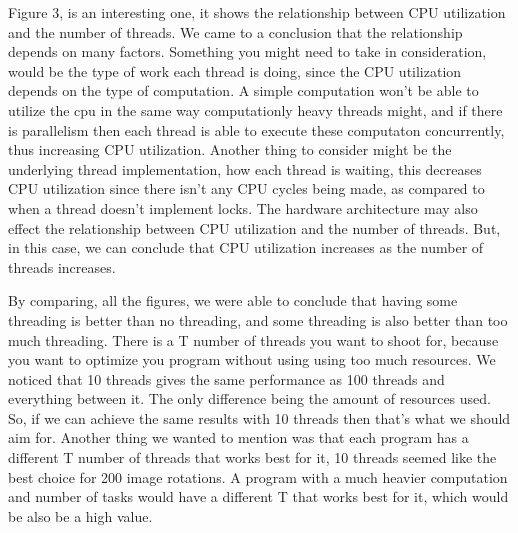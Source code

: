 \documentclass[11pt, titlepage]{article}
\begin{document}
  Figure 3, is an interesting one, it shows the relationship between CPU utilization and the number of threads. We came to a conclusion that the
  relationship depends on many factors. Something you might need to take in consideration, would be the type of work each thread is doing, since
  the CPU utilization depends on the type of computation. A simple computation won't be able to utilize the cpu in the same way computationly heavy
  threads might, and if there is parallelism then each thread is able to execute these computaton concurrently, thus increasing CPU utilization.
  Another thing to consider might be the underlying thread implementation, how each thread is waiting, this decreases CPU utilization since there
  isn't any CPU cycles being made, as compared to when a thread doesn't implement locks. The hardware architecture may also effect the relationship
  between CPU utilization and the number of threads. But, in this case, we can conclude that CPU utilization increases as the number of threads increases.

  By comparing, all the figures, we were able to conclude that having some threading is better than no threading, and some threading is also
  better than too much threading. There is a T number of threads you want to shoot for, because you want to optimize you program without using
  using too much resources. We noticed that 10 threads gives the same performance as 100 threads and everything between it. The only difference
  being the amount of resources used. So, if we can achieve the same results with 10 threads then that's what we should aim for. Another thing we
  wanted to mention was that each program has a different T number of threads that works best for it, 10 threads seemed like the best choice for 200
  image rotations. A program with a much heavier computation and number of tasks would have a different T that works best for it, which would be also
  be a high value.
\end{document}

